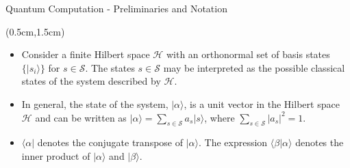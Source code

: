 \documentclass{beamer}
\theoremstyle{definition}
\begin{document}




\begin{frame}{Quantum Computation - Preliminaries and Notation}
    
    \begin{textblock*}{12cm}(0.5cm,1.5cm)
        \begin{itemize}
            \item Consider a finite Hilbert space $\mathcal{H}$ with an orthonormal set of basis states $\{ \lvert s_i \rangle \}$ for $s \in \mathcal{S}$. The states $s \in \mathcal{S}$ may be interpreted as the possible classical states of the system described by $\mathcal{H}$. \\
            \vspace{1cm}
            \item In general, the state of the system, $\lvert \alpha \rangle$, is a unit vector in the Hilbert space $\mathcal{H}$ and can be written as $\lvert \alpha \rangle = \sum_{s \in \mathcal{S}} a_s \lvert s \rangle$, where $\sum_{s \in \mathcal{S}} |a_s|^2 = 1$. \\
            \vspace{1cm}
            \item $\langle \alpha \rvert$ denotes the conjugate transpose of $\lvert \alpha \rangle$. The expression $\langle \beta \rvert \alpha \rangle$ denotes the inner product of $\lvert \alpha \rangle$ and $\lvert \beta \rangle$.

        \end{itemize}
            
    \end{textblock*}
\end{frame}
\end{document}
